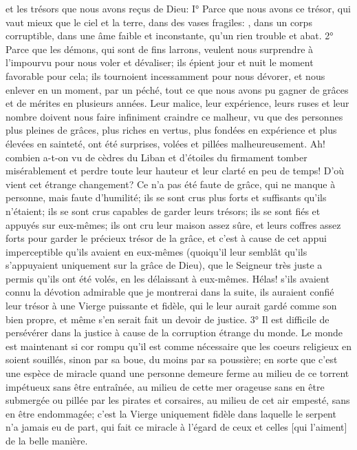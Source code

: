 et les trésors que nous avons reçus de Dieu:
I° Parce que nous avons ce trésor, qui vaut mieux que le ciel et la terre, dans des vases fragiles: , dans un corps corruptible, dans une âme faible et inconstante, qu'un rien
trouble et abat.
 2° Parce que les démons, qui sont de fins larrons, veulent nous surprendre à l'impourvu pour nous voler et
dévaliser; ils épient jour et nuit le moment favorable pour cela; ils tournoient incessamment pour nous dévorer, et
nous enlever en un moment, par un péché, tout ce que nous avons pu gagner de grâces et de mérites en plusieurs
années. Leur malice, leur expérience, leurs ruses et leur nombre doivent nous faire infiniment craindre ce malheur,
vu que des personnes plus pleines de grâces, plus riches en vertus, plus fondées en expérience et plus élevées
en sainteté, ont été surprises, volées et pillées malheureusement. Ah! combien a-t-on vu de cèdres du Liban et
d'étoiles du firmament tomber misérablement et perdre toute leur hauteur et leur clarté en peu de temps! D'où vient
cet étrange changement? Ce n'a pas été faute de grâce, qui ne manque à personne, mais faute d'humilité; ils se
sont crus plus forts et suffisants qu'ils n'étaient; ils se sont crus capables de garder leurs trésors; ils se sont fiés et
appuyés sur eux-mêmes; ils ont cru leur maison assez sûre, et leurs coffres assez forts pour garder le précieux
trésor de la grâce, et c'est à cause de cet appui imperceptible qu'ils avaient en eux-mêmes (quoiqu'il leur semblât
qu'ils s'appuyaient uniquement sur la grâce de Dieu), que le Seigneur très juste a permis qu'ils ont été volés, en les
délaissant à eux-mêmes. Hélas! s'ils avaient connu la dévotion admirable que je montrerai dans la suite, ils
auraient confié leur trésor à une Vierge puissante et fidèle, qui le leur aurait gardé comme son bien propre, et
même s'en serait fait un devoir de justice.
 3° Il est difficile de persévérer dans la justice à cause de la corruption étrange du monde. Le monde est
maintenant si cor rompu qu'il est comme nécessaire que les coeurs religieux en soient souillés, sinon par sa boue,
du moins par sa poussière; en sorte que c'est une espèce de miracle quand une personne demeure ferme au
milieu de ce torrent impétueux sans être entraînée, au milieu de cette mer orageuse sans en être submergée ou
pillée par les pirates et corsaires, au milieu de cet air empesté, sans en être endommagée; c'est la Vierge
uniquement fidèle dans laquelle le serpent n'a jamais eu de part, qui fait ce miracle à l'égard de ceux et celles [qui
l'aiment] de la belle manière.
